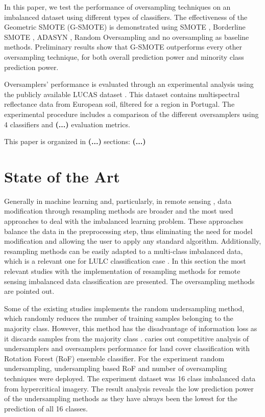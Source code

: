 \documentclass[parskip=full]{scrartcl}
\begin{document}
In this paper, we test the performance of oversampling techniques on an
imbalanced dataset using different types of classifiers. The effectiveness of
the Geometric SMOTE (G-SMOTE) \cite{Douzas2019} is demonstrated using SMOTE
\cite{Chawla2002}, Borderline SMOTE \cite{Han2005}, ADASYN \cite{HaiboHe2008},
Random Oversampling and no oversampling as baseline methods. Preliminary results
show that G-SMOTE outperforms every other oversampling technique, for both
overall prediction power and minority class prediction power.

Oversamplers' performance is evaluated through an experimental analysis using
the publicly available LUCAS dataset \cite{LUCAS2015}. This dataset contains
multispectral reflectance data from European soil, filtered for a region in
Portugal. The experimental procedure includes a comparison of the different
oversamplers using 4 classifiers and \textbf{(...)} evaluation metrics.

This paper is organized in \textbf{(...)} sections: \textbf{(...)}

\section{State of the Art}

Generally in machine learning \cite{Douzas2019} and, particularly, in
remote sensing \cite{Feng2019}, data modification through resampling methods
are broader and the most used approaches to deal with the imbalanced learning
problem. These approaches balance the data in the preprocessing step, thus
eliminating the need for model modification and allowing the user to apply any
standard algorithm. Additionally, resampling methods can be easily adapted to a
multi-class imbalanced data, which is a relevant one for LULC classification
case \cite{Feng2019}. In this section the most relevant studies with the
implementation of resampling methods for remote sensing imbalanced data
classification are presented. The oversampling methods are pointed out.

Some of the existing studies implements the random undersampling method,
which randomly reduces the number of training samples  belonging to the
majority class. However, this method has the disadvantage of information loss
as it discards samples from the majority class  \cite{Feng2019}.
\cite{Feng2018} caries out competitive analysis of  undersamplers and
oversamplers performance for land cover classification with  Rotation Forest
(RoF) ensemble classifier. For the experiment random  undersampling,
undersampling based RoF and number of oversampling techniques  were deployed.
The experiment dataset was 16 class imbalanced data from  hypercritical
imagery. The result analysis reveals the low prediction power of the
undersampling methods as they have always been the lowest for the prediction of
all 16 classes.
\end{document}
